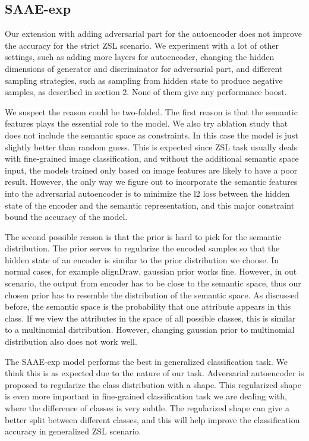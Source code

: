 \documentclass{article}
\begin{document}
\subsection{SAAE-exp}
Our extension with adding adversarial part for the autoencoder does not improve the accuracy for the strict ZSL scenario. We experiment with a lot of other settings, such as adding more layers for autoencoder, changing the hidden dimensions of generator and discriminator for adversarial part, and different sampling strategies, such as sampling from hidden state to produce negative samples, as described in \cite{makhzani2015adversarial} section 2. None of them give any performance boost. 

We suspect the reason could be two-folded. The first reason is that the semantic features plays the essential role to the model. We also try ablation study that does not include the semantic space as constraints. In this case the model is just slightly better than random guess. This is expected since ZSL task usually deals with fine-grained image classification, and without the additional semantic space input, the models trained only based on image features are likely to have a poor result. However, the only way we figure out to incorporate the semantic features into the adversarial autoencoder is to minimize the l2 loss between the hidden state of the encoder and the semantic representation, and this major constraint bound the accuracy of the model. 

The second possible reason is that the prior is hard to pick for the semantic distribution. The prior serves to regularize the encoded samples so that the hidden state of an encoder is similar to the prior distribution we choose. In normal cases, for example alignDraw\cite{mansimov2015generating}, gaussian prior works fine. However, in out scenario, the output from encoder has to be close to the semantic space, thus our chosen prior has to resemble the distribution of the semantic space. As discussed before, the semantic space is the probability that one attribute appears in this class. If we view the attributes in the space of all possible classes, this is similar to a multinomial distribution. However, changing gaussian prior to multinomial distribution also does not work well. 

The SAAE-exp model performs the best in generalized classification task. We think this is as expected due to the nature of our task. Adversarial autoencoder is proposed to regularize the class distribution with a shape. This regularized shape is even more important in fine-grained classification task we are dealing with, where the difference of classes is very subtle. The regularized shape can give a better split between different classes, and this will help improve the classification accuracy in generalized ZSL scenario.
\end{document}
